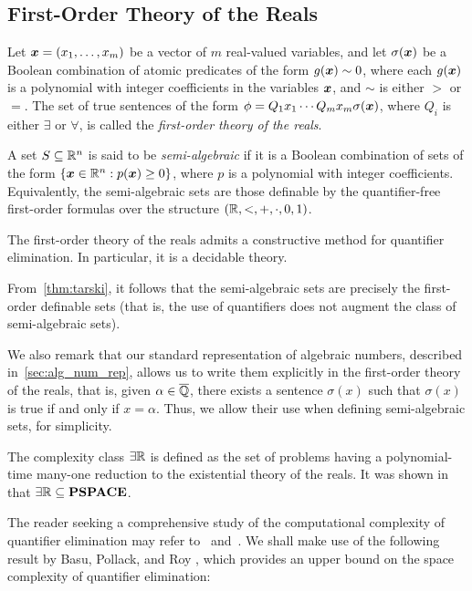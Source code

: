 \subsection{First-Order Theory of the Reals}

Let $\boldsymbol{x}=(x_1,\ldots,x_m)$ be a vector of $m$ real-valued
variables, and let $\sigma(\boldsymbol{x})$ be a Boolean combination
of atomic predicates of the form $g(\boldsymbol{x})\sim 0$, where each
$g(\boldsymbol{x})$ is a polynomial with integer coefficients in the
variables $\boldsymbol{x}$, and $\sim$ is either $>$ or $=$.
The set of true sentences of the form $\phi=Q_1 x_1 \cdots Q_m x_m
\sigma(\boldsymbol{x})$, where $Q_i$ is either $\exists$ or
$\forall$, is called the \emph{first-order theory of the reals}.

A set $S \subseteq \mathbb{R}^{n}$ is said to be \emph{semi-algebraic} if it is a Boolean combination of sets of the form $\lbrace \boldsymbol{x} \in \mathbb{R}^{n}: p(\boldsymbol{x}) \geq 0\rbrace$, where $p$ is a polynomial with integer coefficients. Equivalently, the semi-algebraic sets are those definable by the quantifier-free first-order formulas over the structure $(\mathbb{R}, <, +, \cdot, 0, 1)$.

\begin{theorem}
\label{thm:tarski}
The first-order theory of the reals admits a constructive method for quantifier elimination. In particular, it is a decidable theory.~\cite{Tar51}
\end{theorem}

From~\cref{thm:tarski}, it follows that the semi-algebraic sets are precisely the first-order definable sets (that is, the use of quantifiers does not augment the class of semi-algebraic sets).

We also remark that our standard representation of algebraic numbers, described in~\cref{sec:alg_num_rep}, allows us to write them explicitly in the first-order theory of the reals, that is, given $\alpha\in\overline{\mathbb{Q}}$, there exists a sentence $\sigma(x)$ such that $\sigma(x)$ is true if and only if $x=\alpha$. Thus, we allow their use when defining semi-algebraic sets, for simplicity.

The complexity class $\exists\mathbb{R}$ is defined as the set of problems having a polynomial-time many-one reduction to the existential theory of the reals. It was shown in~\cite{Canny88} that $\exists\mathbb{R}\subseteq \textbf{PSPACE}$.

The reader seeking a comprehensive study of the computational complexity of quantifier elimination may refer to~\cite{Renegar} and~\cite{BPR06}. We shall make use of the following result by Basu, Pollack, and Roy
\cite{BasuPR96}, which provides an upper bound on the space complexity of quantifier elimination:


